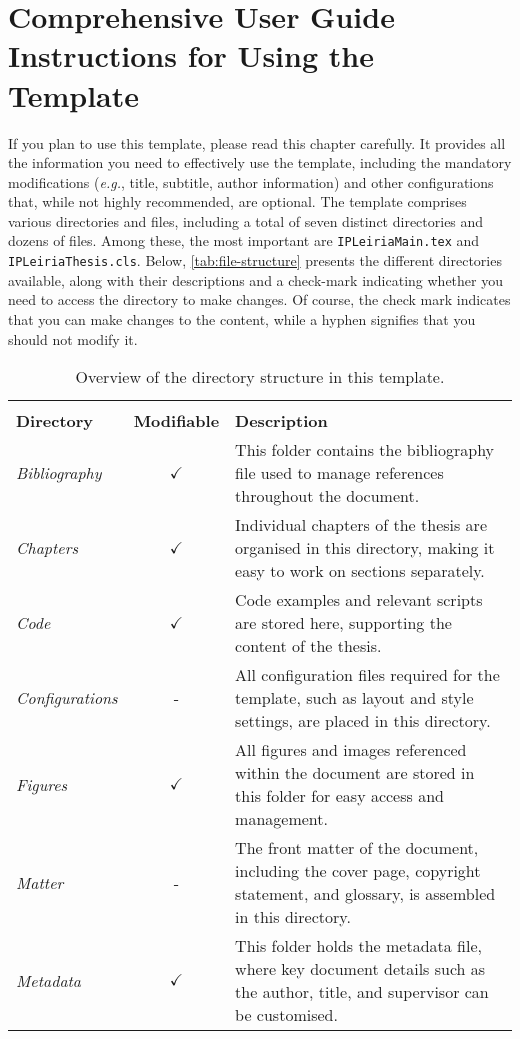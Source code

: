 \chapter[Comprehensive User Guide: Instructions for Using the Template]{Comprehensive User Guide Instructions for Using the Template}
\label{cp:user-guide}

If you plan to use this template, please read this chapter carefully. It provides all the information you need to effectively use the template, including the mandatory modifications (\textit{e.g.}, title, subtitle, author information) and other configurations that, while not highly recommended, are optional. The template comprises various directories and files, including a total of seven distinct directories and dozens of files. Among these, the most important are \texttt{IPLeiriaMain.tex} and \texttt{IPLeiriaThesis.cls}. Below, \autoref{tab:file-structure} presents the different directories available, along with their descriptions and a check-mark indicating whether you need to access the directory to make changes. Of course, the check mark indicates that you can make changes to the content, while a hyphen signifies that you should not modify it.

\begin{table}[!htpb]
    \setlength{\extrarowheight}{2pt}
    \caption[Directory structure and file organisation]{Overview of the directory structure in this template.}
    \label{tab:file-structure}
    \begin{tabularx}{\textwidth}{lcX}
        \toprule
        \\[-1.5\normalbaselineskip]
        \textbf{Directory} & \textbf{Modifiable} & \textbf{Description} \\ [0em]
        \midrule
        \textit{Bibliography} & $\checkmark$ & This folder contains the bibliography file used to manage references throughout the document. \\
        \textit{Chapters} & $\checkmark$ & Individual chapters of the thesis are organised in this directory, making it easy to work on sections separately. \\
        \textit{Code} & $\checkmark$ & Code examples and relevant scripts are stored here, supporting the content of the thesis. \\
        \textit{Configurations} & - & All configuration files required for the template, such as layout and style settings, are placed in this directory. \\
        \textit{Figures} & $\checkmark$ & All figures and images referenced within the document are stored in this folder for easy access and management. \\
        \textit{Matter} & - & The front matter of the document, including the cover page, copyright statement, and glossary, is assembled in this directory. \\
        \textit{Metadata} & $\checkmark$ & This folder holds the metadata file, where key document details such as the author, title, and supervisor can be customised. \\
        \bottomrule
    \end{tabularx}
\end{table}

